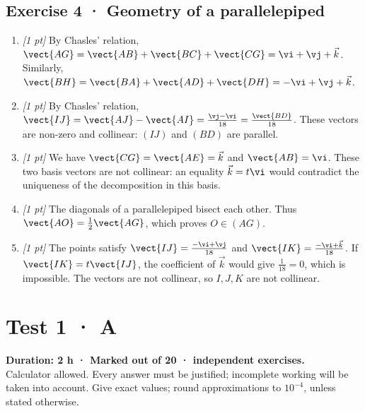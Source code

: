 \subsection*{Exercise 4 · Geometry of a parallelepiped}\begin{enumerate}

\item \textit{[1 pt]} By Chasles' relation, $\vect{AG}=\vect{AB}+\vect{BC}+\vect{CG}=\vi +\vj +\vec k$. Similarly, $\vect{BH}=\vect{BA}+\vect{AD}+\vect{DH}=-\vi +\vj +\vec k$.

\item \textit{[1 pt]} By Chasles' relation, $\vect{IJ}=\vect{AJ}-\vect{AI}=\frac{\vj -\vi }{18}=\frac{\vect{BD}}{18}$. These vectors are non-zero and collinear: $(IJ)$ and $(BD)$ are parallel.

\item \textit{[1 pt]} We have $\vect{CG}=\vect{AE}=\vec k$ and $\vect{AB}=\vi $. These two basis vectors are not collinear: an equality $\vec k=t\vi $ would contradict the uniqueness of the decomposition in this basis.

\item \textit{[1 pt]} The diagonals of a parallelepiped bisect each other. Thus $\vect{AO}=\frac12\vect{AG}$, which proves $O\in(AG)$.

\item \textit{[1 pt]} The points satisfy $\vect{IJ}=\frac{-\vi +\vj }{18}$ and $\vect{IK}=\frac{-\vi +\vec k}{18}$. If $\vect{IK}=t\vect{IJ}$, the coefficient of $\vec k$ would give $\frac{1}{18}=0$, which is impossible. The vectors are not collinear, so $I,J,K$ are not collinear.

\end{enumerate}

\fi

\ifmxteacher

\mxnewpage{}\label{sujet:1-3}

\section*{Test 1 · A}


\textbf{Duration: 2 h · Marked out of 20 ·  independent exercises.}\\Calculator allowed. Every answer must be justified; incomplete working will be taken into account. Give exact values; round approximations to $10^{-4}$, unless stated otherwise.

